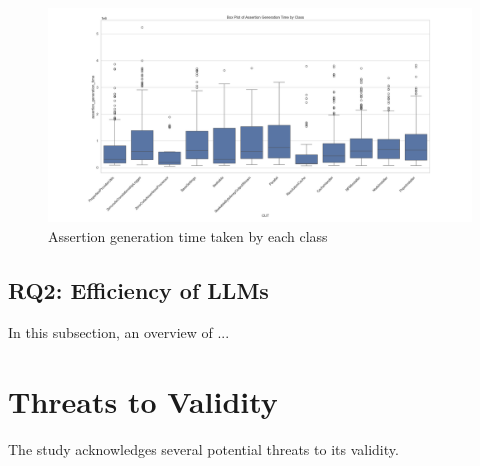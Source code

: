 \begin{figure}[H]
\centering
\includegraphics[width=1\textwidth]{images/assertion_time_by_class.png}
\caption{Assertion generation time taken by each class}
\label{fig:assertion_time_class}
\end{figure}

\vspace{0.1 cm}
\subsection{RQ2: Efficiency of LLMs}
\label{sec:results_rq2}
\vspace{0.1 cm}

In this subsection, an overview of ...

\section{Threats to Validity}
\label{sec:t2v}
\vspace{0.2 cm}

The study acknowledges several potential threats to its validity.

